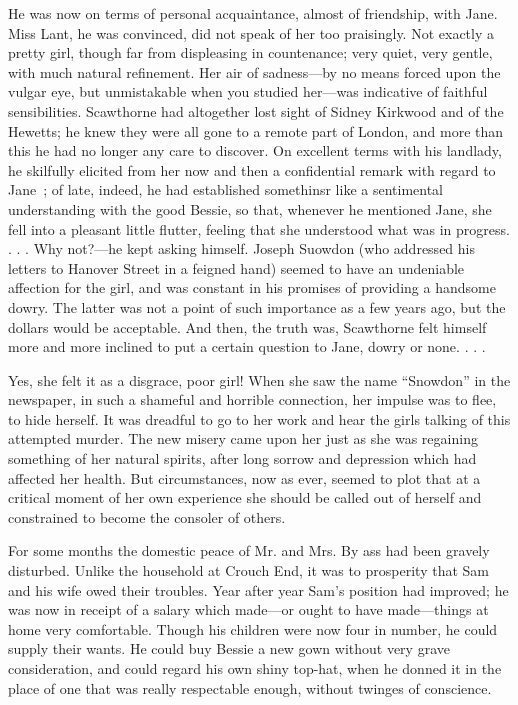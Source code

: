 He was now on terms of personal acquaintance, almost of friendship, with
Jane. Miss Lant, he was convinced, did not speak of her too praisingly.
Not exactly a pretty girl, though far from displeasing in countenance;
very quiet, very gentle, with much natural refinement. Her air of
sadness---by no means forced upon the vulgar eye, but unmistakable when
you studied her---was indicative of faithful sensibilities. Scawthorne
had altogether lost sight of Sidney Kirkwood and of the Hewetts; he knew
they were all gone to a remote part of London, and more than this he had
no longer any care to discover. On excellent terms with his landlady, he
skilfully elicited from her now and then a confidential remark with
regard to Jane~; of late, indeed, he had established somethinsr like a
sentimental understanding with the good Bessie, so that, whenever he
mentioned Jane, she fell into a pleasant little flutter, feeling that
{\protect\hypertarget{290}{}{}} she understood what was in progress. . .
. Why not?---he kept asking himself. Joseph Suowdon (who addressed his
letters to Hanover Street in a feigned hand) seemed to have an
undeniable affection for the girl, and was constant in his promises of
providing a handsome dowry. The latter was not a point of such
importance as a few years ago, but the dollars would be acceptable. And
then, the truth was, Scawthorne felt himself more and more inclined to
put a certain question to Jane, dowry or none. . . .

Yes, she felt it as a disgrace, poor girl! When she saw the name
``Snowdon'' in the newspaper, in such a shameful and horrible
connection, her impulse was to flee, to hide herself. It was dreadful to
go to her work and hear the girls talking of this attempted murder. The
new misery came upon her just as she was regaining something of her
natural spirits, after long sorrow and depression which had affected her
health. But circumstances, now as ever, seemed to plot that at a
critical moment of her own experience she should be called out of
herself and constrained to become the consoler of others.

{\protect\hypertarget{291}{}{}} For some months the domestic peace of
Mr. and Mrs. By ass had been gravely disturbed. Unlike the household at
Crouch End, it was to prosperity that Sam and his wife owed their
troubles. Year after year Sam's position had improved; he was now in
receipt of a salary which made---or ought to have made---things at home
very comfortable. Though his children were now four in number, he could
supply their wants. He could buy Bessie a new gown without very grave
consideration, and could regard his own shiny top-hat, when he donned it
in the place of one that was really respectable enough, without twinges
of conscience.


